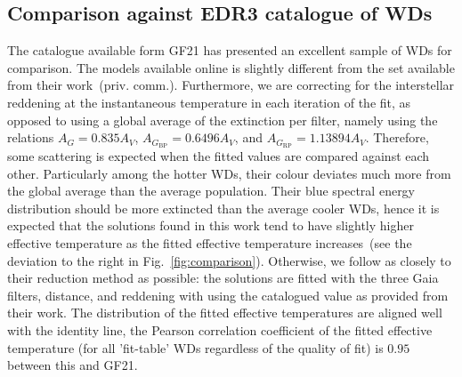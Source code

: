 \documentclass[fleqn,usenatbib]{rasti}
\begin{document}
\subsection{Comparison against EDR3 catalogue of WDs}

The catalogue available form GF21 has presented an excellent sample of WDs for
comparison. The models available online is slightly different from the set
available from their work~(priv. comm.). Furthermore, we are correcting for the
interstellar reddening at the instantaneous temperature in each iteration of
the fit, as opposed to using a global average of the extinction per filter,
namely using the relations $A_{G}=0.835A_{V}$,
$A_{G_{\mathrm{BP}}}=0.6496A_{V}$, and $A_{G_{\mathrm{RP}}}=1.13894A_{V}$.
Therefore, some scattering is expected when the fitted values are compared
against each other. Particularly among the hotter WDs, their colour deviates
much more from the global average than the average population. Their blue
spectral energy distribution should be more extincted than the average cooler
WDs, hence it is expected that the solutions found in this work tend to have
slightly higher effective temperature as the fitted effective temperature
increases~(see the deviation to the right in Fig.~\ref{fig:comparison}).
Otherwise, we follow as closely to their reduction method as
possible: the solutions are fitted with the three Gaia filters, distance, and
reddening with using the catalogued value as provided from their work. The
distribution of the fitted effective temperatures are aligned well with the
identity line, the Pearson correlation coefficient of the fitted effective
temperature (for all 'fit-table' WDs regardless of the quality of fit) is
$0.95$ between this and GF21.
\end{document}
